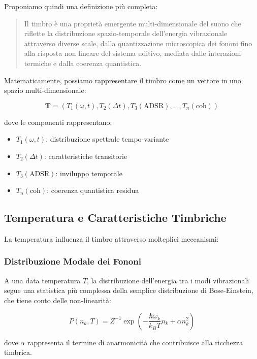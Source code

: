 \documentclass[a4paper,11pt]{article}
\providecommand{\tightlist}{%
  \setlength{\itemsep}{0pt}\setlength{\parskip}{0pt}}
\begin{document}
Proponiamo quindi una definizione più completa:

\begin{quote}
Il timbro è una proprietà emergente multi-dimensionale del suono che
riflette la distribuzione spazio-temporale dell'energia vibrazionale
attraverso diverse scale, dalla quantizzazione microscopica dei fononi
fino alla risposta non lineare del sistema uditivo, mediata dalle
interazioni termiche e dalla coerenza quantistica.
\end{quote}

Matematicamente, possiamo rappresentare il timbro come un vettore in uno
spazio multi-dimensionale:

\[\mathbf{T} = \left(T_1(\omega, t), T_2(\Delta t), T_3(\text{ADSR}), ..., T_n(\text{coh})\right)\]

dove le componenti rappresentano:

\begin{itemize}
\tightlist
\item
  \(T_1(\omega, t)\): distribuzione spettrale tempo-variante
\item
  \(T_2(\Delta t)\): caratteristiche transitorie
\item
  \(T_3(\text{ADSR})\): inviluppo temporale
\item
  \(T_n(\text{coh})\): coerenza quantistica residua
\end{itemize}

\subsection{Temperatura e Caratteristiche
Timbriche}\label{temperatura-e-caratteristiche-timbriche}

La temperatura influenza il timbro attraverso molteplici meccanismi:

\subsubsection{Distribuzione Modale dei
Fononi}\label{distribuzione-modale-dei-fononi}

A una data temperatura \(T\), la distribuzione dell'energia tra i modi
vibrazionali segue una statistica più complessa della semplice
distribuzione di Bose-Einstein, che tiene conto delle non-linearità:

\[P(n_k, T) = Z^{-1}\exp\left(-\frac{\hbar\omega_k}{k_BT}n_k + \alpha n_k^2\right)\]

dove \(\alpha\) rappresenta il termine di anarmonicità che contribuisce
alla ricchezza timbrica.
\end{document}
